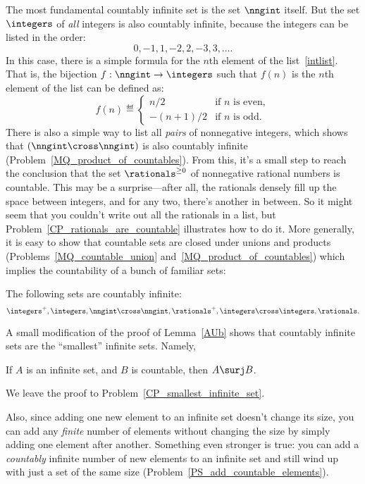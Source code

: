 The most fundamental countably infinite set is the set $\nngint$
itself.  But the set $\integers$ of \emph{all} integers is also
countably infinite, because the integers can be listed in the order:
\begin{equation}\label{intlist}
0,-1,1,-2,2,-3,3,\dots.
\end{equation}
In this case, there is a simple formula for the $n$th element of the
list~\eqref{intlist}.  That is, the bijection $f:\nngint \to
\integers$ such that $f(n)$ is the $n$th element of the list can be
defined as:
\[
f(n) \eqdef \begin{cases} n/2 & \text{if $n$ is even},\\ -(n+1)/2 &
  \text{if $n$ is odd}.
           \end{cases} 
\]    
There is also a simple way to list all \emph{pairs} of nonnegative
integers, which shows that $(\nngint \cross \nngint)$ is also
countably infinite (Problem~\ref{MQ_product_of_countables}).  From
this, it's a small step to reach the conclusion that the set
$\rationals^{\ge 0}$ of nonnegative rational numbers is countable.
This may be a surprise---after all, the rationals densely fill up the
space between integers, and for any two, there's another in between.
So it might seem that you couldn't write out all the rationals in
a list, but Problem~\ref{CP_rationals_are_countable} illustrates how
to do it.  More generally, it is easy to show that countable sets are
closed under unions and products
(Problems~\ref{MQ_countable_union}
and~\ref{MQ_product_of_countables}) which implies the countability of
a bunch of familiar sets:
\begin{corollary}\label{countable_examples}
The following sets are countably infinite:
\[\integers^+, 
 \integers, \nngint \cross \nngint, \rationals^+, \integers \cross
 \integers, \rationals.
\]
\end{corollary}

A small modification of the proof of Lemma~\ref{AUb} shows that
countably infinite sets are the ``smallest'' infinite sets.  Namely,

\begin{lemma}\label{smallestinf}
If $A$ is an infinite set, and $B$ is countable, then $A \surj B$.
\end{lemma}
We leave the proof to Problem~\ref{CP_smallest_infinite_set}.

Also, since adding one new element to an infinite set doesn't change
its size, you can add any \emph{finite} number of elements without
changing the size by simply adding one element after another.
Something even stronger is true: you can add a \emph{countably}
infinite number of new elements to an infinite set and still wind up
with just a set of the same size
(Problem~\ref{PS_add_countable_elements}).

